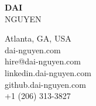 \documentclass[letterpage]{article}
\begin{document}
\thispagestyle{empty} %
\begin{minipage}[c]{0.4\linewidth}
  \raggedright
  \textbf{\fontsize{37px}{1px}\selectfont\textsf{DAI}}\\
  \vspace{7px}
  {\fontsize{37px}{1px}\selectfont\textsf{NGUYEN}}
\end{minipage}
\begin{minipage}{0.01\linewidth}
\end{minipage}
\:\:\:\:\: %
\begin{minipage}[t]{0.6\linewidth}
  \raggedleft
  \vspace*{-30px}
  Atlanta, GA, USA\enspace\faGlobe\\
  dai-nguyen.com\enspace\faGlobe\\
  hire@dai-nguyen.com\enspace\faPaperPlane\\
  linkedin.dai-nguyen.com\enspace\faLinkedin\\
  github.dai-nguyen.com\enspace\faGithubAlt\\
+1 (206) 313-3827\enspace\faPhone\\
\end{minipage}
\vspace*{8px}\\ %

\end{document}
